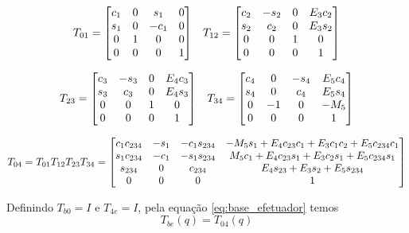 \begin{align*}
{T}_{01} = 
\begin{bmatrix}c_1 & 0 & s_1 &  0 \\
   s_1 & 0 & -c_1 & 0 \\
   0   & 1 &    0 & 0 \\
   0   & 0 &    0 & 1\end{bmatrix}
& &
{T}_{12} =  \begin{bmatrix}c_2 & -s_2 &  0 & E_3 c_2 \\
   s_2 &  c_2 &  0 & E_3 s_2  \\
   0   &    0 &  1 & 	   0  \\
   0   &    0 &  0 &       1\end{bmatrix} 
\end{align*}

\begin{align*}
{T}_{23} = 
\begin{bmatrix}c_3 & -s_3 &  0 & E_4 c_3 \\
   s_3 &  c_3 &  0 & E_4 s_3  \\
   0   &    0 &  1 & 	   0  \\
   0   &    0 &  0 &       1\end{bmatrix}
& &
{T}_{34} = 
\begin{bmatrix}c_4 &    0 &  -s_4 & E_5 c_4 \\
   s_4 &    0 &   c_4 & E_5 s_4 \\
   0   &   -1 &     0 & 	-M_5 \\
   0   &    0 &     0 &       1\end{bmatrix}
\end{align*}


\begin{equation} \label{eq:cine_direta}
{T}_{04} = {T}_{01} {T}_{12}  {T}_{23} {T}_{34} = 
\begin{bmatrix}
   c_1 c_{234} & -s_1 & -c_1 s_{234} & -M_5 s_1 + E_4 c_{23}c_1 + E_3 c_1 c_2 + E_5 c_{234} c_1 \\
   s_1 c_{234} & -c_1 & -s_1 s_{234} &   M_5 c_1+E_4 c_{23} s_1 + E_3 c_2 s_1 + E_5 c_{234} s_1 \\
   s_{234}     &    0 &      c_{234} &					     E_4 s_{23} + E_3 s_2 + E_5 s_{234} \\
   0   &    0 &     0 &      												   1
\end{bmatrix} 
\end{equation}

Definindo ${T}_{b0} = {I}$ e ${T}_{4e} = {I}$, pela equação \eqref{eq:base_efetuador} temos
\begin{equation}
{T}_{be} ({q}) = {T}_{04}({q})
\end{equation}



